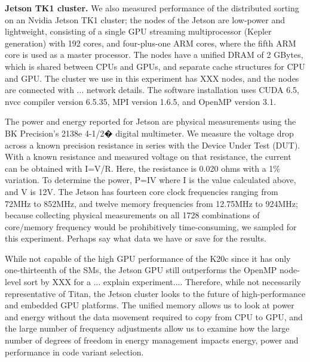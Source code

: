 \noindent
{\bf Jetson TK1 cluster.}
We also measured performance of the distributed sorting on an Nvidia 
Jetson TK1 cluster; the nodes of the Jetson are low-power and lightweight,
consisting of a single GPU streaming multiprocessor (Kepler generation)
with 192 cores, and 
four-plus-one ARM cores, where the fifth ARM core is used as a master processor.
The nodes have a unified DRAM of 2 GBytes, which is shared between CPUs and
GPUs, and separate cache structures for CPU and GPU.
The cluster we use in this experiment has {\color{red} XXX} nodes, and
the nodes are connected with {\color{red} ... network details.}
The software installation uses CUDA 6.5, nvcc compiler version 6.5.35,
MPI version 1.6.5, and OpenMP version 3.1.

The power and energy reported for
Jetson are physical measurements  
using the BK Precision's 2138e 4-1/2� digital multimeter.
We measure the voltage drop across a known precision resistance in series with the Device Under Test (DUT). With a known resistance and measured voltage on that resistance, the current can be obtained with I=V/R. Here, the resistance is 0.020 ohms with a 1\% variation.
To determine the power, P=IV where I is the value calculated above, and V is 12V.
The Jetson has fourteen core clock frequencies ranging from 72MHz to 852MHz,
and twelve memory frequencies from 12.75MHz to 924MHz;
because collecting physical measurements 
on all 1728 combinations of core/memory frequency would 
be prohibitively time-consuming, 
we sampled for this experiment. {\color{red} Perhaps
say what data we have or save for the results.}

While not capable of the high GPU performance of the K20c
since it has only one-thirteenth of the SMs, the
Jetson GPU still outperforms the OpenMP node-level sort by XXX
{\color{red} for a ... explain experiment...}.  
Therefore, while not necessarily representative of Titan, 
the Jetson cluster looks to the future of high-performance and 
embedded GPU platforms.  The unified memory allows us to look 
at power and energy without the data movement required to copy
from CPU to GPU, and the large number of frequency adjustments
allow us to examine how the large number of degrees of freedom
in energy management impacts energy, power and performance in 
code variant selection. 
